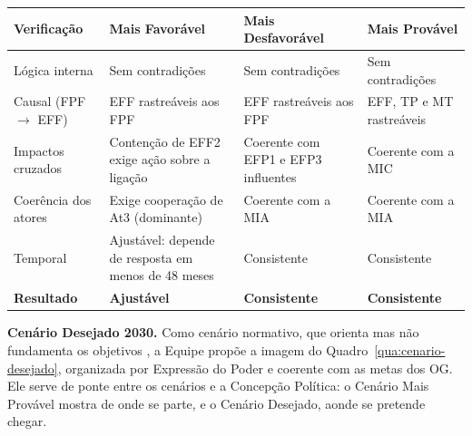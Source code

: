 \documentclass[
	12pt,				%
	openright,			%
	oneside,			%
	a4paper,			%
	chapter=TITLE,		%
	section=TITLE,		%
	english,			%
	french,				%
	spanish,			%
	brazil,				%
 ]{abntex2}
\begin{document}
\begin{quadro}[!htbp]
\centering
\caption{Teste de consistência dos cenários}
\label{qua:teste-consistencia}
\footnotesize
\renewcommand{\arraystretch}{1.0}
\setlength{\tabcolsep}{3pt}
\begin{tabularx}{\textwidth}{|>{\raggedright\arraybackslash}p{3.1cm}|>{\raggedright\arraybackslash}X|>{\raggedright\arraybackslash}X|>{\raggedright\arraybackslash}X|}
\hline
\textbf{Verificação} & \textbf{Mais Favorável} & \textbf{Mais Desfavorável} & \textbf{Mais Provável} \\
\hline
Lógica interna & Sem contradições & Sem contradições & Sem contradições \\
\hline
Causal (FPF $\rightarrow$ EFF) & EFF rastreáveis aos FPF & EFF rastreáveis aos FPF & EFF, TP e MT rastreáveis \\
\hline
Impactos cruzados & Contenção de EFF2 exige ação sobre a ligação & Coerente com EFP1 e EFP3 influentes & Coerente com a MIC \\
\hline
Coerência dos atores & Exige cooperação de At3 (dominante) & Coerente com a MIA & Coerente com a MIA \\
\hline
Temporal & Ajustável: depende de resposta em menos de 48 meses & Consistente & Consistente \\
\hline
\textbf{Resultado} & \textbf{Ajustável} & \textbf{Consistente} & \textbf{Consistente} \\
\hline
\end{tabularx}
\end{quadro}

\textbf{Cenário Desejado 2030.} Como cenário normativo, que orienta mas não
fundamenta os objetivos \cite[p. 113]{esg_mpe2026}, a Equipe propõe a imagem do
Quadro~\ref{qua:cenario-desejado}, organizada por Expressão do Poder e coerente
com as metas dos OG. Ele serve de ponte entre os cenários e a Concepção
Política: o Cenário Mais Provável mostra de onde se parte, e o Cenário Desejado,
aonde se pretende chegar.
\end{document}
